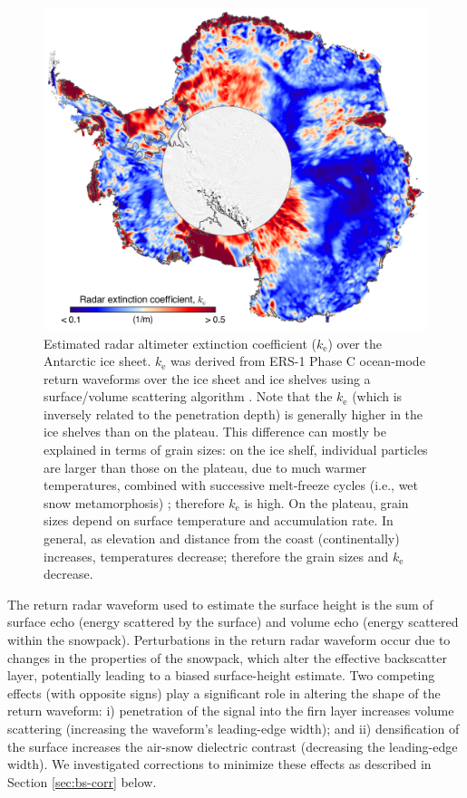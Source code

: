\begin{figure}[!ht]
  \centering
  \includegraphics[width=.85\textwidth]{img/extinction_coef_v3d.png}
  \caption[Estimated radar altimeter extinction coefficient]{
  \ssp \footnotesize
  Estimated radar altimeter extinction coefficient ($k_\text{e}$) over the Antarctic ice sheet. $k_\text{e}$ was derived from ERS-1 Phase C ocean-mode return waveforms over the ice sheet and ice shelves using a surface/volume scattering algorithm \parencite{Davis1993}. Note that the $k_\text{e}$  (which is inversely related to the penetration depth) is generally higher in the ice shelves than on the plateau. This difference can mostly be explained in terms of grain sizes: on the ice shelf, individual particles are larger than those on the plateau, due to much warmer temperatures, combined with successive melt-freeze cycles (i.e., wet snow metamorphosis) \parencite{Zwally1994}; therefore $k_\text{e}$ is high. On the plateau, grain sizes depend on surface temperature and accumulation rate. In general, as elevation and distance from the coast (continentally) increases, temperatures decrease; therefore the grain sizes and $k_\text{e}$ decrease.
  }
  \label{c2f4}
\end{figure}


The return radar waveform used to estimate the surface height is the sum of surface echo (energy scattered by the surface) and volume echo (energy scattered within the snowpack). Perturbations in the return radar waveform occur due to changes in the properties of the snowpack, which alter the effective backscatter layer, potentially leading to a biased surface-height estimate. Two competing effects (with opposite signs) play a significant role in altering the shape of the return waveform: i) penetration of the signal into the firn layer increases volume scattering (increasing the waveform's leading-edge width); and ii) densification of the surface increases the air-snow dielectric contrast (decreasing the leading-edge width). We investigated corrections to minimize these effects as described in Section \ref{sec:bs-corr} below.


